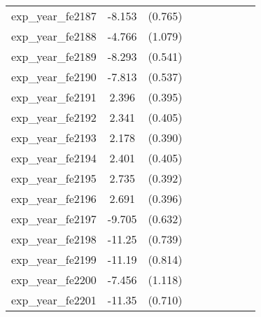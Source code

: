 {\begin{tabular}{l*{4}{cc}}
exp\_year\_fe2187&   -8.153\sym{***}&  (0.765)&                  &         &                  &         &                  &         \\
exp\_year\_fe2188&   -4.766\sym{***}&  (1.079)&                  &         &                  &         &                  &         \\
exp\_year\_fe2189&   -8.293\sym{***}&  (0.541)&                  &         &                  &         &                  &         \\
exp\_year\_fe2190&   -7.813\sym{***}&  (0.537)&                  &         &                  &         &                  &         \\
exp\_year\_fe2191&    2.396\sym{***}&  (0.395)&                  &         &                  &         &                  &         \\
exp\_year\_fe2192&    2.341\sym{***}&  (0.405)&                  &         &                  &         &                  &         \\
exp\_year\_fe2193&    2.178\sym{***}&  (0.390)&                  &         &                  &         &                  &         \\
exp\_year\_fe2194&    2.401\sym{***}&  (0.405)&                  &         &                  &         &                  &         \\
exp\_year\_fe2195&    2.735\sym{***}&  (0.392)&                  &         &                  &         &                  &         \\
exp\_year\_fe2196&    2.691\sym{***}&  (0.396)&                  &         &                  &         &                  &         \\
exp\_year\_fe2197&   -9.705\sym{***}&  (0.632)&                  &         &                  &         &                  &         \\
exp\_year\_fe2198&   -11.25\sym{***}&  (0.739)&                  &         &                  &         &                  &         \\
exp\_year\_fe2199&   -11.19\sym{***}&  (0.814)&                  &         &                  &         &                  &         \\
exp\_year\_fe2200&   -7.456\sym{***}&  (1.118)&                  &         &                  &         &                  &         \\
exp\_year\_fe2201&   -11.35\sym{***}&  (0.710)&                  &         &                  &         &                  &         \\

\end{tabular}}
